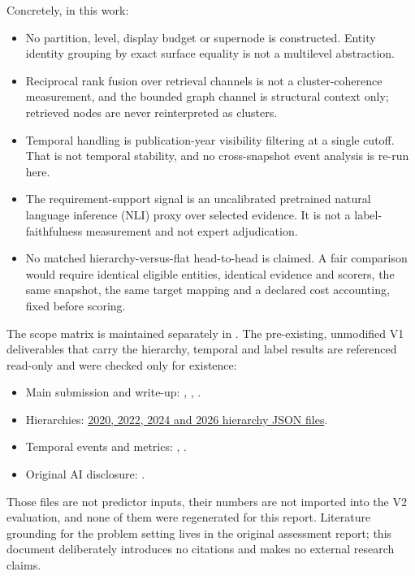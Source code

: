 \documentclass[11pt,a4paper]{article}
\begin{document}
Concretely, in this work:

\begin{itemize}
\item No partition, level, display budget or supernode is constructed. Entity identity grouping by exact surface equality is not a multilevel abstraction.
\item Reciprocal rank fusion over retrieval channels is not a cluster-coherence measurement, and the bounded graph channel is structural context only; retrieved nodes are never reinterpreted as clusters.
\item Temporal handling is publication-year visibility filtering at a single cutoff. That is not temporal stability, and no cross-snapshot event analysis is re-run here.
\item The requirement-support signal is an uncalibrated pretrained natural language inference (NLI) proxy over selected evidence. It is not a label-faithfulness measurement and not expert adjudication.
\item No matched hierarchy-versus-flat head-to-head is claimed. A fair comparison would require identical eligible entities, identical evidence and scorers, the same snapshot, the same target mapping and a declared cost accounting, fixed before scoring.
\end{itemize}

The scope matrix is maintained separately in . The pre-existing, unmodified V1 deliverables that carry the hierarchy, temporal and label results are referenced read-only and were checked only for existence:

\begin{itemize}
\item Main submission and write-up: , , .
\item Hierarchies: \href{../../clean_tshc/outputs/hierarchies/}{2020, 2022, 2024 and 2026 hierarchy JSON files}.
\item Temporal events and metrics: , .
\item Original AI disclosure: .
\end{itemize}

Those files are not predictor inputs, their numbers are not imported into the V2 evaluation, and none of them were regenerated for this report. Literature grounding for the problem setting lives in the original assessment report; this document deliberately introduces no citations and makes no external research claims.
\end{document}
